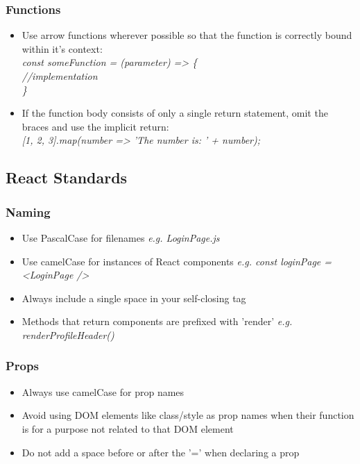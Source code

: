\documentclass[12pt]{report}
\begin{document}
\subsubsection{Functions}
\begin{itemize}[noitemsep]
\item Use arrow functions wherever possible so that the function is correctly bound within it's context: \\
	\textit{
    	const someFunction = (parameter) => \{ \\
        	\hspace*{4ex} //implementation\\
        \}
    }
\item If the  function body consists of only a single return statement, omit the braces and use the implicit return: \\
    \textit{
        \hspace*{4ex} [1, 2, 3].map(number => 'The number is: ' + number);
    }
\end{itemize}

\pagebreak
\subsection{React Standards}
\subsubsection{Naming}
\begin{itemize}[noitemsep]
\item Use PascalCase for filenames \textit{e.g. LoginPage.js}
\item Use camelCase for instances of React components \textit{e.g. const loginPage = <LoginPage />}
\item Always include a single space in your self-closing tag
\item Methods that return components are prefixed with 'render' \textit{e.g. renderProfileHeader()}
\end{itemize}

\subsubsection{Props}
\begin{itemize}[noitemsep]
\item Always use camelCase for prop names
\item Avoid using DOM elements like class/style as prop names when their function is for a purpose not related to that DOM element
\item Do not add a space before or after the '=' when declaring a prop
\end{itemize}
\end{document}
